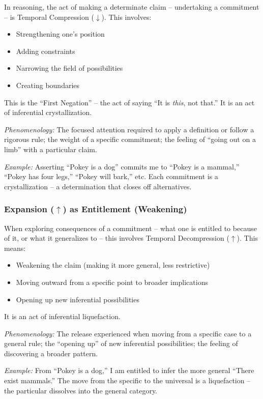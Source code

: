 \documentclass[12pt]{book}
\begin{document}
In reasoning, the act of making a determinate claim -- undertaking a commitment -- is Temporal Compression ($\downarrow$). This involves:
\begin{itemize}
\item Strengthening one's position
\item Adding constraints
\item Narrowing the field of possibilities
\item Creating boundaries
\end{itemize}

This is the ``First Negation'' -- the act of saying ``It is \textit{this}, not that.'' It is an act of inferential crystallization.

\textit{Phenomenology:} The focused attention required to apply a definition or follow a rigorous rule; the weight of a specific commitment; the feeling of ``going out on a limb'' with a particular claim.

\textit{Example:} Asserting ``Pokey is a dog'' commits me to ``Pokey is a mammal,'' ``Pokey has four legs,'' ``Pokey will bark,'' etc. Each commitment is a crystallization -- a determination that closes off alternatives.

\subsubsection{Expansion ($\uparrow$) as Entitlement (Weakening)}

When exploring consequences of a commitment -- what one is entitled to because of it, or what it generalizes to -- this involves Temporal Decompression ($\uparrow$). This means:
\begin{itemize}
\item Weakening the claim (making it more general, less restrictive)
\item Moving outward from a specific point to broader implications
\item Opening up new inferential possibilities
\end{itemize}

It is an act of inferential liquefaction.

\textit{Phenomenology:} The release experienced when moving from a specific case to a general rule; the ``opening up'' of new inferential possibilities; the feeling of discovering a broader pattern.

\textit{Example:} From ``Pokey is a dog,'' I am entitled to infer the more general ``There exist mammals.'' The move from the specific to the universal is a liquefaction -- the particular dissolves into the general category.
\end{document}
